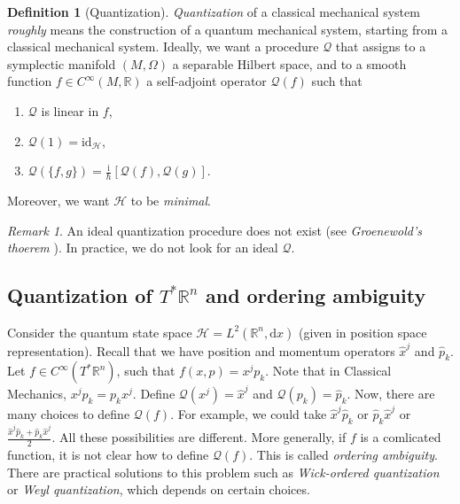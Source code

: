 \documentclass[11pt]{amsart}
\numberwithin{equation}{section}
\theoremstyle{plain}
\theoremstyle{definition}
\newtheorem{defn}{Definition}[subsection]
\theoremstyle{remark}
\newtheorem{rem}{Remark}[subsection]
\newcommand{\R}{\mathbb{R}}
\newcommand{\dd}{{\mathrm{d}}}
\newcommand{\id}{\mathrm{id}}
\newcommand{\calH}{\mathcal{H}}
\newcommand{\I}{\mathrm{i}}
\begin{document}
\begin{defn}[Quantization]
\emph{Quantization} of a classical mechanical system \emph{roughly} means the construction of a quantum mechanical system, starting from a classical mechanical system. Ideally, we want a procedure $\mathscr{Q}$ that assigns to a symplectic manifold $(M,\Omega)$ a separable Hilbert space, and to a smooth function $f\in C^\infty(M,\R)$ a self-adjoint operator $\mathscr{Q}(f)$ such that 
\begin{enumerate}[$(i)$]
\item{$\mathscr{Q}$ is linear in $f$,}
\item{$\mathscr{Q}(1)=\id_\calH$,}
\item{$\mathscr{Q}(\{f,g\})=\frac{\I}{\hbar}[\mathscr{Q}(f),\mathscr{Q}(g)]$.}
\end{enumerate}
Moreover, we want $\calH$ to be \emph{minimal}.
\end{defn}


\begin{rem}
An ideal quantization procedure does not exist (see \emph{Groenewold's thoerem} \cite{Groenewold1946}). In practice, we do not look for an ideal $\mathscr{Q}$.
\end{rem}

\subsection{Quantization of $T^*\R^n$ and ordering ambiguity}
Consider the quantum state space $\calH=L^2(\R^n,\dd x)$ (given in position space representation). Recall that we have position and momentum operators $\widehat{x}^j$ and $\widehat{p}_k$. Let $f\in C^\infty(T^*\R^n)$, such that $f(x,p)=x^jp_k$. Note that in Classical Mechanics, $x^jp_k=p_kx^j$. Define $\mathscr{Q}(x^j)=\widehat{x}^j$ and $\mathscr{Q}(p_k)=\widehat{p}_k$. Now, there are many choices to define $\mathscr{Q}(f)$. For example, we could take $\widehat{x}^j\widehat{p}_k$ or $\widehat{p}_k\widehat{x}^j$ or $\frac{\widehat{x}^j\widehat{p}_k+\widehat{p}_k\widehat{x}^j}{2}$. All these possibilities are different. More generally, if $f$ is a comlicated function, it is not clear how to define $\mathscr{Q}(f)$. This is called \emph{ordering ambiguity}. There are practical solutions to this problem such as \emph{Wick-ordered quantization} or \emph{Weyl quantization}, which depends on certain choices.
\end{document}
